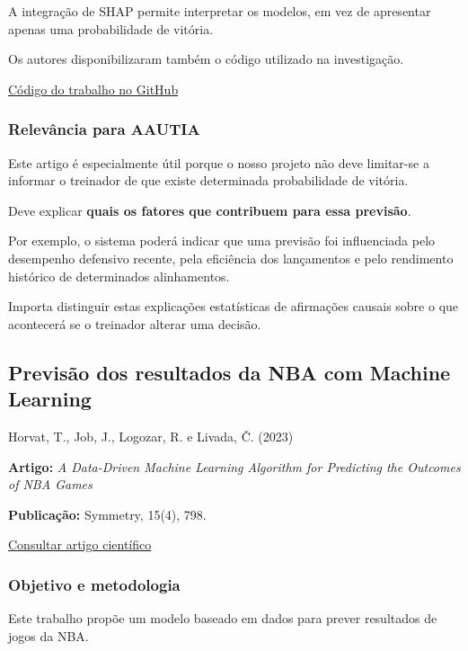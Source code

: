 A integração de SHAP permite interpretar os modelos, em vez de
apresentar apenas uma probabilidade de vitória.

Os autores disponibilizaram também o código utilizado na investigação.

\href{https://github.com/YanOuyang514/NBA-game-outcome-prediction-and-quantitative-analysis-methodology}{Código
do trabalho no GitHub}

\subsubsection{Relevância para
AAUTIA}\label{aautia:relevuxe2ncia-para-aautia-1}

Este artigo é especialmente útil porque o nosso projeto não deve
limitar-se a informar o treinador de que existe determinada
probabilidade de vitória.

Deve explicar \textbf{quais os fatores que contribuem para essa
previsão}.

Por exemplo, o sistema poderá indicar que uma previsão foi influenciada
pelo desempenho defensivo recente, pela eficiência dos lançamentos e
pelo rendimento histórico de determinados alinhamentos.

Importa distinguir estas explicações estatísticas de afirmações causais
sobre o que acontecerá se o treinador alterar uma decisão.

\subsection{Previsão dos resultados da NBA com Machine
Learning}\label{aautia:previsuxe3o-dos-resultados-da-nba-com-machine-learning}

Horvat, T., Job, J., Logozar, R. e Livada, Č. (2023) \cite{horvat2023}

\textbf{Artigo:} \emph{A Data-Driven Machine Learning Algorithm for
Predicting the Outcomes of NBA Games}

\textbf{Publicação:} Symmetry, 15(4), 798.

\href{https://doi.org/10.3390/sym15040798}{Consultar artigo científico}

\subsubsection{Objetivo e metodologia}\label{aautia:objetivo-e-metodologia-2}

Este trabalho propõe um modelo baseado em dados para prever resultados
de jogos da NBA.

